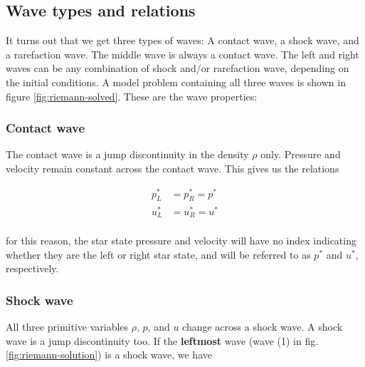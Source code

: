 \subsection{Wave types and relations}





It turns out that we get three types of waves: A contact wave, a shock wave, and a rarefaction wave.
The middle wave is always a contact wave.
The left and right waves can be any combination of shock and/or rarefaction wave, depending on the initial conditions.
A model problem containing all three waves is shown in figure \ref{fig:riemann-solved}.
These are the wave properties:






\subsubsection{Contact wave}

The contact wave is a jump discontinuity in the density $\rho$ only.
Pressure and velocity remain constant across the contact wave.
This gives us the relations


\begin{align*}
	p^*_L &= p^*_R = p^*\\
	u^*_L &= u^*_R = u^*\\
\end{align*}

for this reason, the star state pressure and velocity will have no index indicating whether they are the left or right star state, and will be referred to as $p^*$ and $u^*$, respectively.









\subsubsection{Shock wave}

All three primitive variables $\rho$, $p$, and $u$ change across a shock wave.
A shock wave is a jump discontinuity too.
If the \textbf{leftmost} wave (wave (1) in fig. \ref{fig:riemann-solution}) is a shock wave, we have

